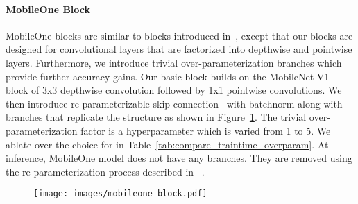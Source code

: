 \paragraph{MobileOne Block}
MobileOne blocks are similar to blocks introduced in~\cite{NEURIPS2020_expandnets,Ding_2019_ICCV,Ding_2021_repvgg,ding2021diverse}, except that our blocks are designed for convolutional layers that are factorized into depthwise and pointwise layers. Furthermore, we introduce trivial over-parameterization branches which provide further accuracy gains. Our basic block builds on the MobileNet-V1~\cite{Howard2017MobileNets} block of 3x3 depthwise convolution followed by 1x1 pointwise convolutions. We then introduce re-parameterizable skip connection~\cite{Ding_2021_repvgg} with batchnorm along with branches that replicate the structure as shown in Figure~\ref{fig:mobileone_blocks}. The trivial over-parameterization factor  is a hyperparameter which is varied from 1 to 5. We ablate over the choice for  in Table~\ref{tab:compare_traintime_overparam}. At inference, MobileOne model does not have any branches. They are removed using the re-parameterization process described in ~\cite{Ding_2021_repvgg, ding2021diverse}.

 \begin{figure}
    \centering
    \texttt{[image: images/mobileone\_block.pdf]}
    \label{fig:mobileone_blocks}
 \end{figure}
 
